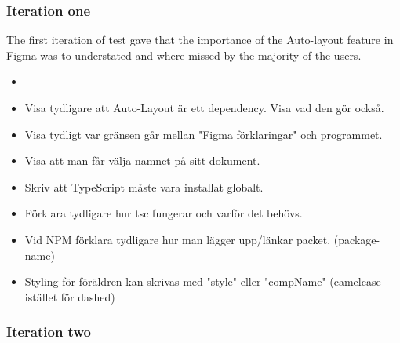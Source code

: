 \subsubsection{Iteration one}%
\label{ssub:Iteration one}
The first iteration of test gave that the importance of the Auto-layout feature in Figma was to understated and where missed by the majority of the users. 

\begin{itemize}
   \item 
   \item Visa tydligare att Auto-Layout är ett dependency. Visa vad den gör också.
   \item Visa tydligt var gränsen går mellan "Figma förklaringar" och programmet.
   \item Visa att man får välja namnet på sitt dokument.
   \item Skriv att TypeScript måste vara installat globalt.
   \item Förklara tydligare hur tsc fungerar och varför det behövs.
   \item Vid NPM förklara tydligare hur man lägger upp/länkar packet. (package-name)
   \item Styling för föräldren kan skrivas med "style" eller "compName" (camelcase istället för dashed)
\end{itemize}

\subsubsection{Iteration two}%
\label{ssub:Iteration two}




